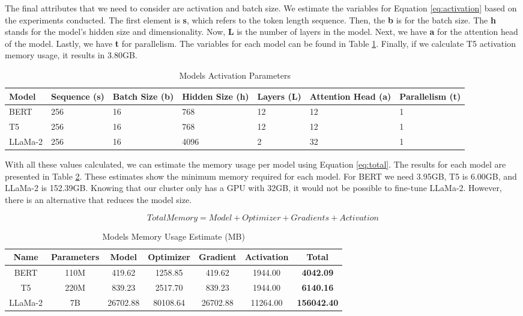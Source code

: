 The final attributes that we need to consider are activation and batch size. We estimate the variables for Equation \ref{eq:activation} based on the experiments conducted. The first element is \textbf{s}, which refers to the token length sequence. Then, the \textbf{b} is for the batch size. The \textbf{h} stands for the model's hidden size and dimensionality. Now, \textbf{L} is the number of layers in the model. Next, we have \textbf{a} for the attention head of the model. Lastly, we have \textbf{t} for parallelism. The variables for each model can be found in Table \ref{table:ModelActivation}. Finally, if we calculate T5 activation memory usage, it results in 3.80GB.

\begin{table}[H]
	\centering
	\caption{Models Activation Parameters}
	\begin{tabular}{||p{1.75cm} | p{2cm} | p{1.75cm} | p{1.75cm} | p{1.5cm} | p{2cm} | p{2.75cm}||} 
		\hline
		\textbf{Model} & \textbf{Sequence (s)} & \textbf{Batch Size (b)} & \textbf{Hidden Size (h)} & \textbf{Layers (L)} & \textbf{Attention Head (a)} & \textbf{Parallelism (t)} \\ [1ex] 
		\hline
		BERT & 256 & 16 & 768 & 12 & 12 & 1 \\ [1ex]
		\hline
		T5 & 256 & 16 & 768 & 12 & 12 & 1  \\[1ex]
		\hline
		LLaMa-2 & 256 & 16 & 4096 & 2 & 32 & 1  \\[1ex]
		\hline
	\end{tabular}
	\label{table:ModelActivation}
\end{table}


With all these values calculated, we can estimate the memory usage per model using Equation \ref{eq:total}. The results for each model are presented in Table \ref{table:MemoryUsage}. These estimates show the minimum memory required for each model. For BERT we need 3.95GB, T5 is 6.00GB, and LLaMa-2 is 152.39GB. Knowing that our cluster only has a GPU with 32GB, it would not be possible to fine-tune LLaMa-2. However, there is an alternative that reduces the model size.
	
\[ Total Memory = Model + Optimizer + Gradients + Activation \label{eq:total} \tag{5} \] 

\begin{table}[H]
	\centering
	\caption{Models Memory Usage Estimate (MB)}
	\begin{tabular}{||c | c | c | c | c | c | c||} 
		\hline
		\textbf{Name} & \textbf{Parameters} & \textbf{Model} & \textbf{Optimizer} & \textbf{Gradient} & \textbf{Activation} & \textbf{Total} \\ [1ex] 
		\hline
		BERT & 110M & 419.62 & 1258.85 & 419.62 & 1944.00 & \textbf{4042.09} \\ [1ex]
		\hline
		T5 & 220M & 839.23 & 2517.70 & 839.23 & 1944.00 & \textbf{6140.16}  \\[1ex]
		\hline
		LLaMa-2 & 7B & 26702.88 & 80108.64 & 26702.88 & 11264.00 & \textbf{156042.40}  \\[1ex]
		\hline
	\end{tabular}
	\label{table:MemoryUsage}
\end{table}

